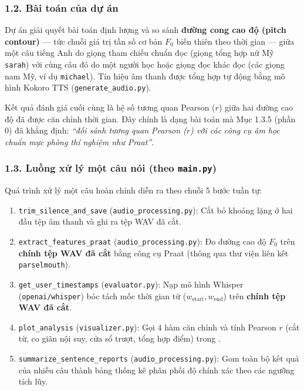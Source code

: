\documentclass[11pt,a4paper]{article}
\begin{document}
\subsubsection*{1.2. Bài toán của dự án}
Dự án giải quyết bài toán định lượng và so sánh \textbf{đường cong cao độ (pitch contour)} --- tức chuỗi giá trị tần số cơ bản $F_0$ biến thiên theo thời gian --- giữa một câu tiếng Anh do giọng tham chiếu chuẩn đọc (giọng tổng hợp nữ Mỹ \texttt{sarah}) với cùng câu đó do một người học hoặc giọng đọc khác đọc (các giọng nam Mỹ, ví dụ \texttt{michael}). Tín hiệu âm thanh được tổng hợp tự động bằng mô hình Kokoro TTS (\texttt{generate\_audio.py}). 

Kết quả đánh giá cuối cùng là hệ số tương quan Pearson ($r$) giữa hai đường cao độ đã được căn chỉnh thời gian. Đây chính là dạng bài toán mà Mục 1.3.5 (phần 0) đã khẳng định: \textit{``đối sánh tương quan Pearson ($r$) với các công cụ âm học chuẩn mực phòng thí nghiệm như Praat''}.

\subsubsection*{1.3. Luồng xử lý một câu nói (theo \texttt{main.py})}
Quá trình xử lý một câu hoàn chỉnh diễn ra theo chuỗi 5 bước tuần tự:
\begin{enumerate}
    \setlength{\itemsep}{1.5pt}
    \item \texttt{trim\_silence\_and\_save} (\texttt{audio\_processing.py}): Cắt bỏ khoảng lặng ở hai đầu tệp âm thanh và ghi ra tệp WAV đã cắt.
    \item \texttt{extract\_features\_praat} (\texttt{audio\_processing.py}): Đo đường cao độ $F_0$ trên \textbf{chính tệp WAV đã cắt} bằng công cụ Praat (thông qua thư viện liên kết \texttt{parselmouth}).
    \item \texttt{get\_user\_timestamps} (\texttt{evaluator.py}): Nạp mô hình Whisper (\texttt{openai/whisper}) bóc tách mốc thời gian từ ($w_{\text{start}}, w_{\text{end}}$) trên \textbf{chính tệp WAV đã cắt}.
    \item \texttt{plot\_analysis} (\texttt{visualizer.py}): Gọi 4 hàm căn chỉnh và tính Pearson $r$ (cắt từ, co giãn nội suy, cửa sổ trượt, tổng hợp điểm) trong .
    \item \texttt{summarize\_sentence\_reports} (\texttt{audio\_processing.py}): Gom toàn bộ kết quả của nhiều câu thành bảng thống kê phân phối độ chính xác theo các ngưỡng tích lũy.
\end{enumerate}
\end{document}
